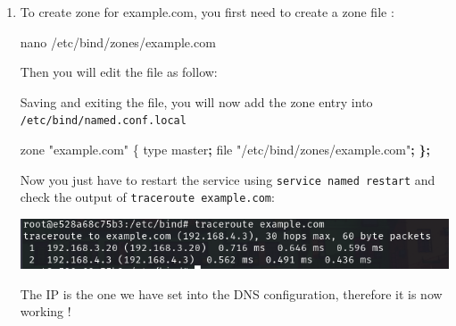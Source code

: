 \documentclass[a4paper,11pt,singlespacing]{article}
\newenvironment{Shaded}{}{}
\newcommand{\BuiltInTok}[1]{\textcolor[rgb]{0.00,0.50,0.00}{#1}}
\newcommand{\ErrorTok}[1]{\textcolor[rgb]{1.00,0.00,0.00}{\textbf{#1}}}
\newcommand{\ExtensionTok}[1]{#1}
\newcommand{\FunctionTok}[1]{\textcolor[rgb]{0.02,0.16,0.49}{#1}}
\newcommand{\KeywordTok}[1]{\textcolor[rgb]{0.00,0.44,0.13}{\textbf{#1}}}
\newcommand{\NormalTok}[1]{#1}
\newcommand{\StringTok}[1]{\textcolor[rgb]{0.25,0.44,0.63}{#1}}
\newcommand{\VariableTok}[1]{\textcolor[rgb]{0.10,0.09,0.49}{#1}}
\begin{document}
\begin{enumerate}
\def\labelenumi{\arabic{enumi}.}
\item
  To create zone for example.com, you first need to create a zone file :

\begin{Shaded}
\begin{Highlighting}[]
    \FunctionTok{nano}\NormalTok{ /etc/bind/zones/example.com}
\end{Highlighting}
\end{Shaded}

  Then you will edit the file as follow:

\begin{Shaded}
\end{Shaded}

  Saving and exiting the file, you will now add the zone entry into
  \texttt{/etc/bind/named.conf.local}

\begin{Shaded}
\begin{Highlighting}[]
    \ExtensionTok{zone} \StringTok{"example.com"}\NormalTok{ \{}
        \BuiltInTok{type}\NormalTok{ master}\KeywordTok{;}
        \FunctionTok{file} \StringTok{"/etc/bind/zones/example.com"}\KeywordTok{;}
    \ErrorTok{\}}\KeywordTok{;}
\end{Highlighting}
\end{Shaded}

  Now you just have to restart the service using
  \texttt{service\ named\ restart} and check the output of
  \texttt{traceroute\ example.com}:

  \includegraphics{Images/Image12.png}

  The IP is the one we have set into the DNS configuration, therefore it
  is now working !
\end{enumerate}
\end{document}
